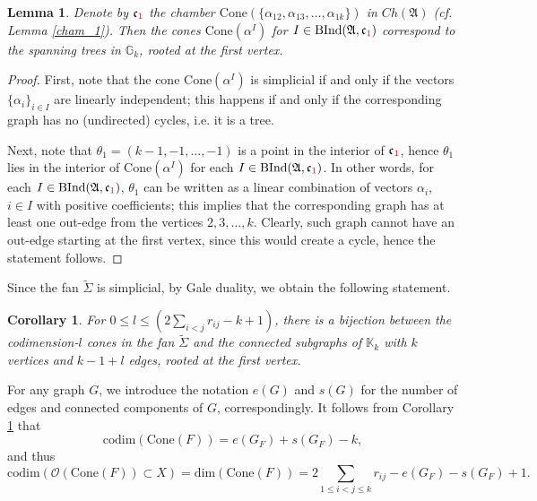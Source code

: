 \documentclass[11pt]{article}
\newtheorem{lemma}[theo]{Lemma}
\newtheorem{coro}[theo]{Corollary}
\theoremstyle{definition}
\numberwithin{equation}{section}
\newcommand{\cone}{\mathrm{Cone}}
\newcommand{\A}{\mathfrak{A}}
\newcommand{\tilS}{\widetilde{\Sigma}}
\begin{document}
\begin{lemma}\label{lemma:trees}
Denote by $\mathfrak{c}_{\textcolor{red}{1}}$  the chamber 
$\cone(\{\alpha_{12},\alpha_{13}, \ldots ,\alpha_{1k}\})$ in $ Ch(\A)$ (cf.  Lemma 
\ref{cham_1}). Then the cones $\cone(\alpha^I)$ for $I\in\mathrm{BInd}(\A, 
\mathfrak{c}_{\textcolor{red}{1}})$ correspond to the spanning trees in 
$\mathbb{G}_k$, rooted at the first vertex. 
\end{lemma}
\begin{proof}
First, note that the cone $\cone(\alpha^I)$ is simplicial if and only if the 
vectors $ \{\alpha_i\}_{i\in I} $ are linearly independent; this happens if and 
only if the corresponding  graph has no (undirected) cycles, i.e.  it  is a 
tree. 

Next, note that $\theta_1= (k-1,-1, \ldots ,-1)$ is a point in the interior of $\mathfrak{c}_{\textcolor{red}{1}}$, hence $\theta_1$ lies in the interior of $\cone(\alpha^I)$ for each $I\in\mathrm{BInd}(\A, \mathfrak{c}_{\textcolor{red}{1}})$. In other words, for each $I\in\mathrm{BInd}(\A, \mathfrak{c}_{\textcolor{red}{1}})$,  $\theta_1$ can be written as a linear combination of vectors $\alpha_i$, $i\in I$ with positive coefficients; this implies that the corresponding graph has at least one out-edge from the vertices $2, 3, \ldots , k$. 
Clearly, such graph cannot have an out-edge starting at the first vertex, since this would create a cycle, hence the statement follows. 
\end{proof}


Since the fan $\tilS$ is simplicial, by Gale duality, we obtain the following 
statement. 
\begin{coro}\label{conedimcount}
For $0\leq l  \leq (2\sum_{i<j}r_{ij} - k +1)$, there is a bijection between 
the codimension-$l$ cones in the fan $\widetilde{\Sigma}$ and the connected  
subgraphs of $\mathbb{K}_k$ with $ k $ vertices and $k-1+l$ edges, rooted at 
the first vertex.
\end{coro}	

For any graph $G$, we introduce the notation $e(G)$ and $s(G)$ for the number of edges and connected components of $G$, correspondingly. It follows from Corollary \ref{conedimcount} that 
\begin{equation}\label{codimcone}
\mathrm{codim}(\cone(F)) = e(G_F)+s(G_F)-k,
\end{equation}
and thus
\begin{equation}\label{codimstrata}
\mathrm{codim}(\mathcal{O}(\cone(F))\subset X) =\mathrm{dim}(\cone(F)) =  2\sum_{1\leq i< j\leq k}r_{ij} -e(G_F)-s(G_F)+1.
\end{equation}
\end{document}
